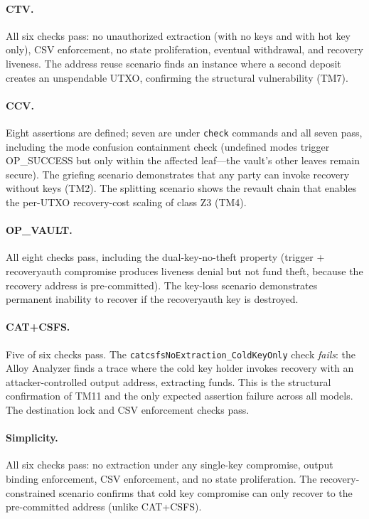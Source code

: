 \paragraph{CTV.}
All six checks pass: no unauthorized extraction (with no keys and with hot key only),
CSV enforcement, no state proliferation, eventual withdrawal, and recovery liveness.
The address reuse scenario finds an instance where a second deposit creates an
unspendable UTXO, confirming the structural vulnerability (TM7).

\paragraph{CCV.}
Eight assertions are defined; seven are under \texttt{check} commands and all seven pass, including the mode confusion containment check (undefined
modes trigger OP\_SUCCESS but only within the affected leaf---the vault's other
leaves remain secure). The griefing scenario demonstrates that any party can invoke
recovery without keys (TM2). The splitting scenario shows the revault chain that
enables the per-UTXO recovery-cost scaling of class Z3 (TM4).

\paragraph{OP\_VAULT.}
All eight checks pass, including the dual-key-no-theft property (trigger +
recoveryauth compromise produces liveness denial but not fund theft, because the
recovery address is pre-committed). The key-loss scenario demonstrates permanent
inability to recover if the recoveryauth key is destroyed.

\paragraph{CAT+CSFS.}
Five of six checks pass. The \texttt{catcsfsNoExtraction\_ColdKeyOnly} check
\emph{fails}: the Alloy Analyzer finds a trace where the cold key holder invokes
recovery with an attacker-controlled output address, extracting funds. This is the
structural confirmation of TM11 and the only expected assertion failure across all
models. The destination lock and CSV enforcement checks pass.

\paragraph{Simplicity.}
All six checks pass: no extraction under any single-key compromise, output binding
enforcement, CSV enforcement, and no state proliferation. The recovery-constrained
scenario confirms that cold key compromise can only recover to the pre-committed
address (unlike CAT+CSFS).

